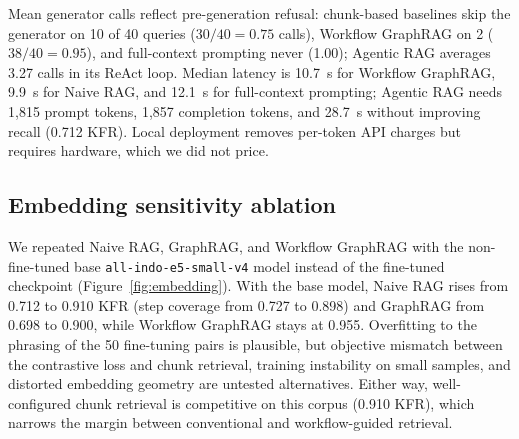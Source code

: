 \documentclass[preprint,10pt]{elsarticle}
\begin{document}
\begin{table}[!htbp]
\centering
\caption{Operational resource consumption per query across evaluated systems: mean prompt and completion tokens, mean generator invocations, and median execution latency across all 40 questions.}
\label{tab:cost}
\small
\setlength{\tabcolsep}{4pt}
\resizebox{\textwidth}{!}{%
}
\end{table}

Mean generator calls reflect pre-generation refusal: chunk-based baselines skip the generator on 10 of 40 queries ($30/40=0.75$ calls), Workflow GraphRAG on 2 ($38/40=0.95$), and full-context prompting never (1.00); Agentic RAG averages 3.27 calls in its ReAct loop. Median latency is 10.7~s for Workflow GraphRAG, 9.9~s for Naive RAG, and 12.1~s for full-context prompting; Agentic RAG needs 1,815 prompt tokens, 1,857 completion tokens, and 28.7~s without improving recall (0.712 KFR). Local deployment removes per-token API charges but requires hardware, which we did not price.

\subsection{Embedding sensitivity ablation}
\label{sec:ablation-embedding}
We repeated Naive RAG, GraphRAG, and Workflow GraphRAG with the non-fine-tuned base \texttt{all-indo-e5-small-v4} model instead of the fine-tuned checkpoint (Figure~\ref{fig:embedding}). With the base model, Naive RAG rises from 0.712 to 0.910 KFR (step coverage from 0.727 to 0.898) and GraphRAG from 0.698 to 0.900, while Workflow GraphRAG stays at 0.955. Overfitting to the phrasing of the 50 fine-tuning pairs is plausible, but objective mismatch between the contrastive loss and chunk retrieval, training instability on small samples, and distorted embedding geometry are untested alternatives. Either way, well-configured chunk retrieval is competitive on this corpus (0.910 KFR), which narrows the margin between conventional and workflow-guided retrieval.
\end{document}
